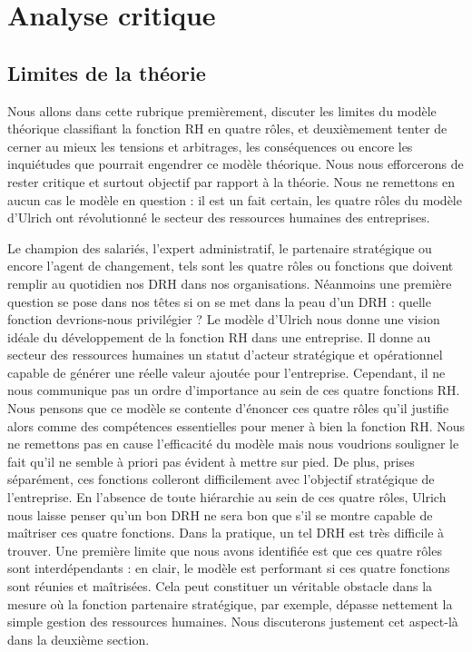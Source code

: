 \documentclass[a4paper, 12pt]{article}
\begin{document}
\section{Analyse critique}

\subsection{Limites de la théorie}

Nous allons dans cette rubrique premièrement, discuter les limites du modèle théorique classifiant la fonction RH en quatre rôles, et deuxièmement tenter de cerner au mieux les tensions et arbitrages, les conséquences ou encore les inquiétudes que pourrait engendrer ce modèle théorique. Nous nous efforcerons de rester critique et surtout objectif par rapport à la théorie. Nous ne remettons en aucun cas le modèle en question : il est un fait certain, les quatre rôles du modèle d'Ulrich ont révolutionné le secteur des ressources humaines des entreprises.

Le champion des salariés, l'expert administratif, le partenaire stratégique ou encore l'agent de changement, tels sont les quatre rôles ou fonctions que doivent remplir au quotidien nos DRH dans nos organisations. Néanmoins une première question se pose dans nos têtes si on se met dans la peau d'un DRH : quelle fonction devrions-nous privilégier ? Le modèle d'Ulrich nous donne une vision idéale du développement de la fonction RH dans une entreprise. Il donne au secteur des ressources humaines un statut d'acteur stratégique et opérationnel capable de générer une réelle valeur ajoutée pour l'entreprise. Cependant, il ne nous communique pas un ordre d'importance au sein de ces quatre fonctions RH. Nous pensons que ce modèle se contente d'énoncer ces quatre rôles qu'il justifie alors comme des compétences essentielles pour mener à bien la fonction RH. Nous ne remettons pas en cause l'efficacité du modèle mais nous voudrions souligner le fait qu'il ne semble à priori pas évident à mettre sur pied. De plus, prises séparément, ces fonctions colleront difficilement avec l'objectif stratégique de l'entreprise.
En l'absence de toute hiérarchie au sein de ces quatre rôles, Ulrich nous laisse penser qu'un bon DRH ne sera bon que s'il se montre capable de maîtriser ces quatre fonctions. Dans la pratique, un tel DRH est très difficile à trouver. 
Une première limite que nous avons identifiée est que ces quatre rôles sont interdépendants : en clair, le modèle est performant si ces quatre fonctions sont réunies et maîtrisées. Cela peut constituer un véritable obstacle dans la mesure où la fonction partenaire stratégique, par exemple, dépasse nettement la simple gestion des ressources humaines. Nous discuterons justement cet aspect-là dans la deuxième section. 
\end{document}
